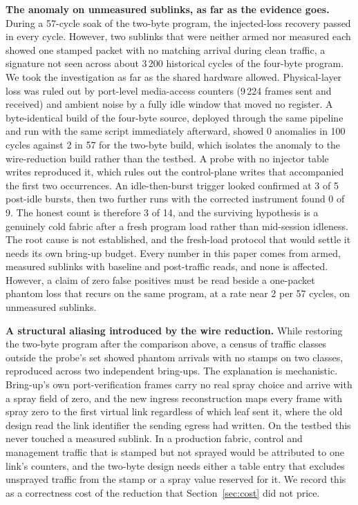 \textbf{The anomaly on unmeasured sublinks, as far as the evidence goes.} During a 57-cycle soak of the two-byte program, the injected-loss recovery passed in every cycle. However, two sublinks that were neither armed nor measured each showed one stamped packet with no matching arrival during clean traffic, a signature not seen across about 3\,200 historical cycles of the four-byte program. We took the investigation as far as the shared hardware allowed. Physical-layer loss was ruled out by port-level media-access counters (9\,224 frames sent and received) and ambient noise by a fully idle window that moved no register. A byte-identical build of the four-byte source, deployed through the same pipeline and run with the same script immediately afterward, showed 0 anomalies in 100 cycles against 2 in 57 for the two-byte build, which isolates the anomaly to the wire-reduction build rather than the testbed. A probe with no injector table writes reproduced it, which rules out the control-plane writes that accompanied the first two occurrences. An idle-then-burst trigger looked confirmed at 3 of 5 post-idle bursts, then two further runs with the corrected instrument found 0 of 9. The honest count is therefore 3 of 14, and the surviving hypothesis is a genuinely cold fabric after a fresh program load rather than mid-session idleness. The root cause is not established, and the fresh-load protocol that would settle it needs its own bring-up budget. Every number in this paper comes from armed, measured sublinks with baseline and post-traffic reads, and none is affected. However, a claim of zero false positives must be read beside a one-packet phantom loss that recurs on the same program, at a rate near 2 per 57 cycles, on unmeasured sublinks.

\textbf{A structural aliasing introduced by the wire reduction.} While restoring the two-byte program after the comparison above, a census of traffic classes outside the probe's set showed phantom arrivals with no stamps on two classes, reproduced across two independent bring-ups. The explanation is mechanistic. Bring-up's own port-verification frames carry no real spray choice and arrive with a spray field of zero, and the new ingress reconstruction maps every frame with spray zero to the first virtual link regardless of which leaf sent it, where the old design read the link identifier the sending egress had written. On the testbed this never touched a measured sublink. In a production fabric, control and management traffic that is stamped but not sprayed would be attributed to one link's counters, and the two-byte design needs either a table entry that excludes unsprayed traffic from the stamp or a spray value reserved for it. We record this as a correctness cost of the reduction that Section~\ref{sec:cost} did not price.

